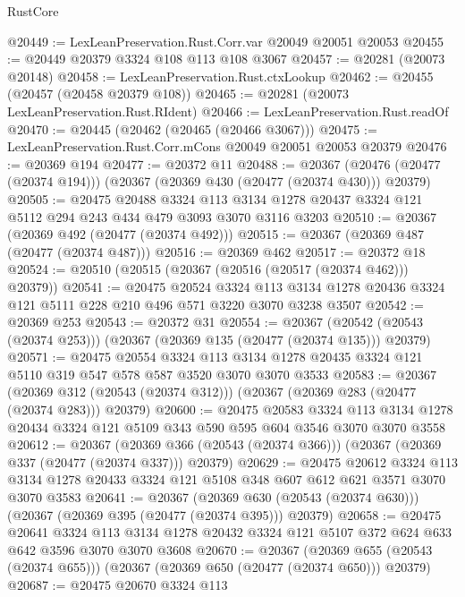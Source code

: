 \begin{lexlean}{RustCore}
\begin{coremodule}
@20449 := LexLeanPreservation.Rust.Corr.var @20049 @20051 @20053
@20455 := @20449 @20379 @3324 @108 @113 @108 @3067
@20457 := @20281 (@20073 @20148)
@20458 := LexLeanPreservation.Rust.ctxLookup
@20462 := @20455 (@20457 (@20458 @20379 @108))
@20465 := @20281 (@20073 LexLeanPreservation.Rust.RIdent)
@20466 := LexLeanPreservation.Rust.readOf
@20470 := @20445 (@20462 (@20465 (@20466 @3067)))
@20475 := LexLeanPreservation.Rust.Corr.mCons @20049 @20051 @20053 @20379
@20476 := @20369 @194
@20477 := @20372 @11
@20488 := @20367
    (@20476 (@20477 (@20374 @194)))
    (@20367 (@20369 @430 (@20477 (@20374 @430))) @20379)
@20505 := @20475
    @20488
    @3324
    @113
    @3134
    @1278
    @20437
    @3324
    @121
    @5112
    @294
    @243
    @434
    @479
    @3093
    @3070
    @3116
    @3203
@20510 := @20367 (@20369 @492 (@20477 (@20374 @492)))
@20515 := @20367 (@20369 @487 (@20477 (@20374 @487)))
@20516 := @20369 @462
@20517 := @20372 @18
@20524 := @20510 (@20515 (@20367 (@20516 (@20517 (@20374 @462))) @20379))
@20541 := @20475
    @20524
    @3324
    @113
    @3134
    @1278
    @20436
    @3324
    @121
    @5111
    @228
    @210
    @496
    @571
    @3220
    @3070
    @3238
    @3507
@20542 := @20369 @253
@20543 := @20372 @31
@20554 := @20367
    (@20542 (@20543 (@20374 @253)))
    (@20367 (@20369 @135 (@20477 (@20374 @135))) @20379)
@20571 := @20475
    @20554
    @3324
    @113
    @3134
    @1278
    @20435
    @3324
    @121
    @5110
    @319
    @547
    @578
    @587
    @3520
    @3070
    @3070
    @3533
@20583 := @20367
    (@20369 @312 (@20543 (@20374 @312)))
    (@20367 (@20369 @283 (@20477 (@20374 @283))) @20379)
@20600 := @20475
    @20583
    @3324
    @113
    @3134
    @1278
    @20434
    @3324
    @121
    @5109
    @343
    @590
    @595
    @604
    @3546
    @3070
    @3070
    @3558
@20612 := @20367
    (@20369 @366 (@20543 (@20374 @366)))
    (@20367 (@20369 @337 (@20477 (@20374 @337))) @20379)
@20629 := @20475
    @20612
    @3324
    @113
    @3134
    @1278
    @20433
    @3324
    @121
    @5108
    @348
    @607
    @612
    @621
    @3571
    @3070
    @3070
    @3583
@20641 := @20367
    (@20369 @630 (@20543 (@20374 @630)))
    (@20367 (@20369 @395 (@20477 (@20374 @395))) @20379)
@20658 := @20475
    @20641
    @3324
    @113
    @3134
    @1278
    @20432
    @3324
    @121
    @5107
    @372
    @624
    @633
    @642
    @3596
    @3070
    @3070
    @3608
@20670 := @20367
    (@20369 @655 (@20543 (@20374 @655)))
    (@20367 (@20369 @650 (@20477 (@20374 @650))) @20379)
@20687 := @20475
    @20670
    @3324
    @113

\end{coremodule}
\end{lexlean}
